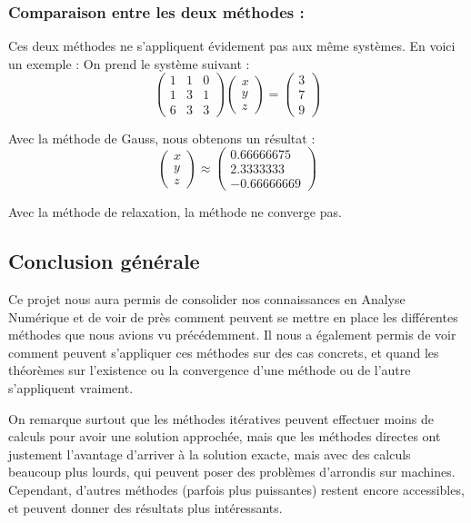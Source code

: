 \documentclass{article}
\theoremstyle{mes_theoremes}
\begin{document}
\textcolor{bleu}{\section*{Comparaison entre les deux méthodes :}}
Ces deux méthodes ne s'appliquent évidement pas aux même systèmes. En voici un exemple :
On prend le système suivant : 
\[\left(\begin{matrix}
   1 & 1 & 0 \\
   1 & 3 & 1 \\
   6 & 3 & 3 \end{matrix}\right)
\left(\begin{matrix}
   x\\
   y\\
   z
\end{matrix}\right)
=
\left(\begin{matrix}
   3 \\
   7 \\
   9 
\end{matrix}\right)
\]

Avec la méthode de Gauss, nous obtenons un résultat :
\[
\left(\begin{matrix}
   x\\
   y\\
   z
\end{matrix}\right)
\approx \left(\begin{matrix}
   0.66666675\\
   2.3333333\\
   -0.66666669 
\end{matrix}\right)
\]

Avec la méthode de relaxation, la méthode ne converge pas.

\newpage
\textcolor{or}{\part*{Conclusion générale}}
Ce projet nous aura permis de consolider nos connaissances en Analyse Numérique et de voir de près comment peuvent se mettre en place les différentes méthodes que nous avions vu précédemment. Il nous a également permis de voir comment peuvent s'appliquer ces méthodes sur des cas concrets, et quand les théorèmes sur l'existence ou la convergence d'une méthode ou de l'autre s'appliquent vraiment.

\bigskip
On remarque surtout que les méthodes itératives peuvent effectuer moins de calculs pour avoir une solution approchée, mais que les méthodes directes ont justement l'avantage d'arriver à la solution exacte, mais avec des calculs beaucoup plus lourds, qui peuvent poser des problèmes d'arrondis sur machines. \\
Cependant, d'autres méthodes (parfois plus puissantes) restent encore accessibles, et peuvent donner des résultats plus intéressants.
\end{document}
